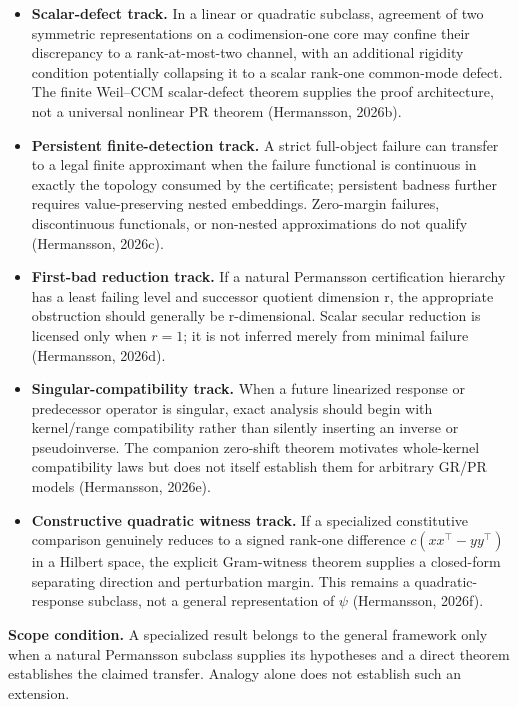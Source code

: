 \documentclass[10pt]{article}
\begin{document}
\begin{itemize}
\item \textbf{Scalar-defect track.} In a linear or quadratic subclass, agreement of two symmetric representations on a codimension-one core may confine their discrepancy to a rank-at-most-two channel, with an additional rigidity condition potentially collapsing it to a scalar rank-one common-mode defect. The finite Weil--CCM scalar-defect theorem supplies the proof architecture, not a universal nonlinear PR theorem (Hermansson, 2026b).
\item \textbf{Persistent finite-detection track.} A strict full-object failure can transfer to a legal finite approximant when the failure functional is continuous in exactly the topology consumed by the certificate; persistent badness further requires value-preserving nested embeddings. Zero-margin failures, discontinuous functionals, or non-nested approximations do not qualify (Hermansson, 2026c).
\item \textbf{First-bad reduction track.} If a natural Permansson certification hierarchy has a least failing level and successor quotient dimension r, the appropriate obstruction should generally be r-dimensional. Scalar secular reduction is licensed only when \(r=1\); it is not inferred merely from minimal failure (Hermansson, 2026d).
\item \textbf{Singular-compatibility track.} When a future linearized response or predecessor operator is singular, exact analysis should begin with kernel/range compatibility rather than silently inserting an inverse or pseudoinverse. The companion zero-shift theorem motivates whole-kernel compatibility laws but does not itself establish them for arbitrary GR/PR models (Hermansson, 2026e).
\item \textbf{Constructive quadratic witness track.} If a specialized constitutive comparison genuinely reduces to a signed rank-one difference \(c(xx^\top-yy^\top)\) in a Hilbert space, the explicit Gram-witness theorem supplies a closed-form separating direction and perturbation margin. This remains a quadratic-response subclass, not a general representation of \(\psi\) (Hermansson, 2026f).
\end{itemize}

\textbf{Scope condition.} A specialized result belongs to the general framework only when a natural Permansson subclass supplies its hypotheses and a direct theorem establishes the claimed transfer. Analogy alone does not establish such an extension.
\end{document}
